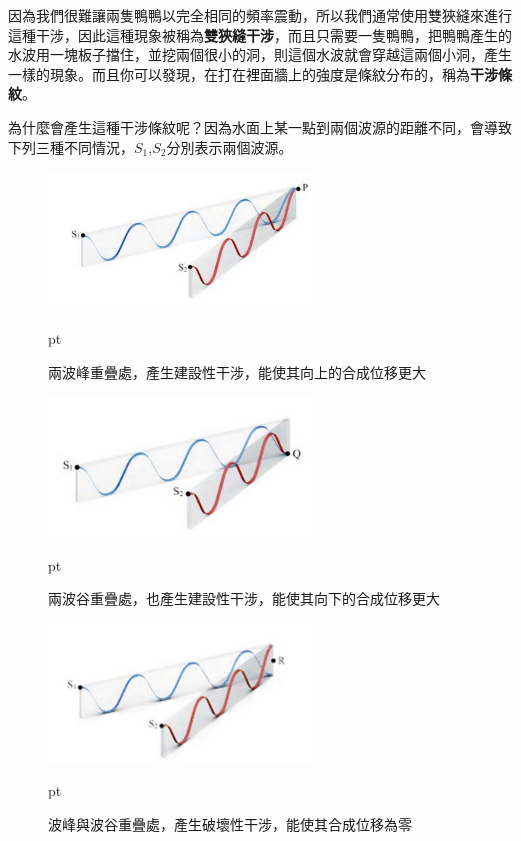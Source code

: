 因為我們很難讓兩隻鴨鴨以完全相同的頻率震動，所以我們通常使用雙狹縫來進行這種干涉，因此這種現象被稱為\textbf{雙狹縫干涉}，而且只需要一隻鴨鴨，把鴨鴨產生的水波用一塊板子擋住，並挖兩個很小的洞，則這個水波就會穿越這兩個小洞，產生一樣的現象。而且你可以發現，在打在裡面牆上的強度是條紋分布的，稱為\textbf{干涉條紋}。

為什麼會產生這種干涉條紋呢？因為水面上某一點到兩個波源的距離不同，會導致下列三種不同情況，$S_1$,$S_2$分別表示兩個波源。
\begin{figure}[H]
\centering
\graphicspath{{physics/}}
\includegraphics[width=7cm, center]{construct.png}
\caption{兩波峰重疊處，產生建設性干涉，能使其向上的合成位移更大}  pt
\label{fig:con1}
\end{figure}

\begin{figure}[H]
\centering
\graphicspath{{physics/}}
\includegraphics[width=7cm, center]{construct2.png}
\caption{兩波谷重疊處，也產生建設性干涉，能使其向下的合成位移更大}  pt
\label{fig:con2}
\end{figure}

\begin{figure}[H]
\centering
\graphicspath{{physics/}}
\includegraphics[width=7cm, center]{destruct.png}
\caption{波峰與波谷重疊處，產生破壞性干涉，能使其合成位移為零}  pt
\label{fig:de}
\end{figure}

